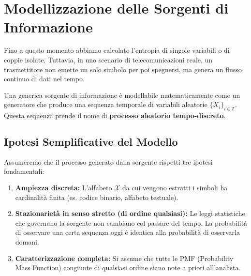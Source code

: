 
\section{Modellizzazione delle Sorgenti di Informazione}

Fino a questo momento abbiamo calcolato l'entropia di singole variabili o di coppie isolate. Tuttavia, in uno scenario di telecomunicazioni reale, un trasmettitore non emette un solo simbolo per poi spegnersi, ma genera un flusso continuo di dati nel tempo. 

Una generica sorgente di informazione è modellabile matematicamente come un generatore che produce una sequenza temporale di variabili aleatorie $\{X_i\}_{i \in \mathbb{Z}}$. Questa sequenza prende il nome di \textbf{processo aleatorio tempo-discreto}.

\begin{center}
\vspace{0.3cm}
\vspace{0.3cm}
\end{center}

\subsection{Ipotesi Semplificative del Modello}

Assumeremo che il processo generato dalla sorgente rispetti tre ipotesi fondamentali:
\begin{enumerate}
    \item \textbf{Ampiezza discreta:} L'alfabeto $\mathcal{X}$ da cui vengono estratti i simboli ha cardinalità finita (es. codice binario, alfabeto testuale).
    \item \textbf{Stazionarietà in senso stretto (di ordine qualsiasi):} Le leggi statistiche che governano la sorgente non cambiano col passare del tempo. La probabilità di osservare una certa sequenza oggi è identica alla probabilità di osservarla domani.
    \item \textbf{Caratterizzazione completa:} Si assume che tutte le PMF (Probability Mass Function) congiunte di qualsiasi ordine siano note a priori all'analista.
\end{enumerate}


